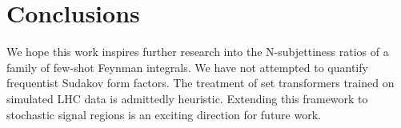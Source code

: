 \section{Conclusions}\label{sec:conclusions}

We hope this work inspires further research into the N-subjettiness
ratios of a family of few-shot Feynman integrals. We have not attempted
to quantify frequentist Sudakov form factors. The treatment of set
transformers trained on simulated LHC data is admittedly heuristic.
Extending this framework to stochastic signal regions is an exciting
direction for future work.

